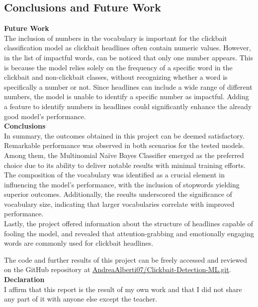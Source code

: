 \documentclass{article}
\begin{document}
\begin{multicols}{2}
\section{Conclusions and Future Work}
\textbf{Future Work}\\
The inclusion of numbers in the vocabulary is important for the clickbait classification model as clickbait headlines 
often contain numeric values. However, in the list of impactful words, can be noticed that only one number appears.
This is because the model relies solely on the frequency of a specific word in the clickbait and 
non-clickbait classes, without recognizing whether a word is specifically a number or not. Since headlines 
can include a wide range of different numbers, the model is unable to identify a specific number as impactful.
Adding a feature to identify numbers in headlines could significantly enhance the already good model's performance.\\

\noindent
\textbf{Conclusions}\\
In summary, the outcomes obtained in this project can be deemed satisfactory. Remarkable performance was 
observed in both scenarios for the tested models. Among them, the Multinomial Naïve Bayes Classifier emerged 
as the preferred choice due to its ability to deliver notable results with minimal training efforts. 
The composition of the vocabulary was identified as a crucial element in influencing the model's performance, 
with the inclusion of stopwords yielding superior outcomes. Additionally, the results underscored the significance 
of vocabulary size, indicating that larger vocabularies correlate with improved performance.\\
Lastly, the project offered information about the structure of headlines capable of fooling the model, 
and revealed that attention-grabbing and emotionally engaging words are commonly used for clickbait headlines.

\noindent
The code and further results of this project can be freely accessed and reviewed on the GitHub repository at 
\href{https://github.com/AndreaAlberti07/Clickbait-Detection-ML.git}{\underline{AndreaAlberti07/Clickbait-Detection-ML.git}}.\\






\noindent
\textcolor{gray!80}{\textbf{Declaration}}\\
\textcolor{gray!70}{I aﬃrm that this report is the result of my own work and that I did not share any part of it with anyone else except the teacher.
}


\end{multicols}
\end{document}
